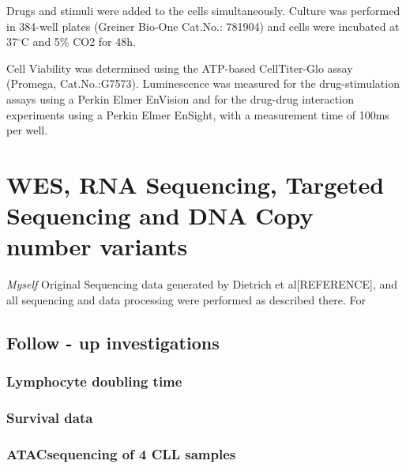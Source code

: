 \documentclass[11pt, a4paper, twosided]{book}
\begin{document}
Drugs and stimuli were added to the cells simultaneously. Culture was performed in 384-well plates (Greiner Bio-One Cat.No.: 781904) and cells were incubated at 37\(^\circ\)C and 5\% CO2 for 48h.

Cell Viability was determined using the ATP-based CellTiter-Glo assay (Promega, Cat.No.:G7573). Luminescence was measured for the drug-stimulation assays using a Perkin Elmer EnVision and for the drug-drug interaction experiments using a Perkin Elmer EnSight, with a measurement time of 100ms per well.

\hypertarget{wes-rna-sequencing-targeted-sequencing-and-dna-copy-number-variants}{%
\section{WES, RNA Sequencing, Targeted Sequencing and DNA Copy number variants}\label{wes-rna-sequencing-targeted-sequencing-and-dna-copy-number-variants}}

\emph{Myself} Original
Sequencing data generated by Dietrich et al{[}REFERENCE{]}, and all sequencing and data processing were performed as described there. For

\hypertarget{follow---up-investigations}{%
\subsection{Follow - up investigations}\label{follow---up-investigations}}

\hypertarget{lymphocyte-doubling-time}{%
\subsubsection{Lymphocyte doubling time}\label{lymphocyte-doubling-time}}

\hypertarget{survival-data}{%
\subsubsection{Survival data}\label{survival-data}}

\hypertarget{atacsequencing-of-4-cll-samples}{%
\subsubsection{ATACsequencing of 4 CLL samples}\label{atacsequencing-of-4-cll-samples}}
\end{document}
